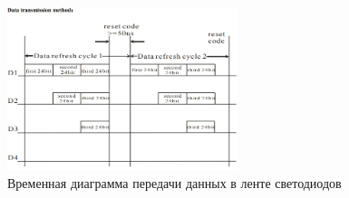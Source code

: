 \begin{figure}[H]
  \centering
  \includegraphics[width=0.6\textwidth]{assets/images/theoretical/Временная диаграма передачи данных.png}
  \caption{Временная диаграмма передачи данных в ленте светодиодов}
  \label{img:WS2812__data_transmission}
\end{figure}
